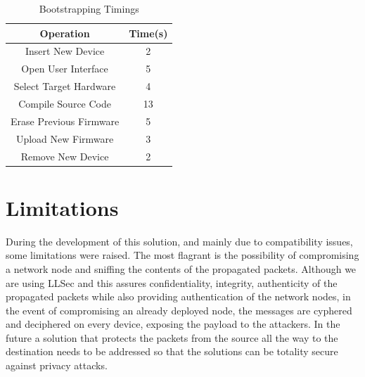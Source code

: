 \begin{table}
\centering
\caption{Bootstrapping Timings}
\label{tab:bootstrapping_time}
\begin{tabular}{|c|c|} \hline
Operation&Time(s)\\ \hline
Insert New Device&2\\ \hline
Open User Interface&5\\ \hline
Select Target Hardware&4\\ \hline
Compile Source Code&13\\ \hline
Erase Previous Firmware&5\\ \hline
Upload New Firmware&3\\ \hline
Remove New Device&2\\ 
\hline\end{tabular}
\end{table}

\section{Limitations}
During the development of this solution, and mainly due to compatibility issues, some limitations were raised. The most flagrant is the possibility of compromising a network node and sniffing the contents of the propagated packets. Although we are using \gls{LLSec} and this assures confidentiality, integrity, authenticity of the propagated packets while also providing authentication of the network nodes, in the event of compromising an already deployed node, the messages are cyphered and deciphered on every device, exposing the payload to the attackers. In the future a solution that protects the packets from the source all the way to the destination needs to be addressed so that the solutions can be totality secure against privacy attacks.

